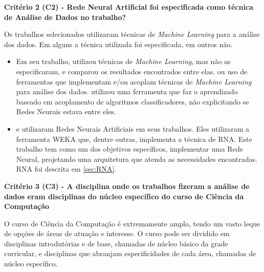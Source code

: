 \documentclass[
	12pt,				%
	openright,			%
	oneside,
	a4paper,			%
	english,			%
	french,				%
	spanish,			%
	brazil,				%
	]{abntex2}
\begin{document}
\textbf{Critério 2 (C2) - Rede Neural Artificial foi especificada como técnica de Análise de Dados no trabalho?}

Os trabalhos selecionados utilizaram técnicas de \textit{Machine Learning} para a análise dos dados. Em alguns a técnica utilizada foi especificada, em outros não.

\begin{itemize}
    \item Em seu trabalho,  utilizou técnicas de \textit{Machine Learning}, mas não as especificaram, e comparou os resultados encontrados entre elas. ou uso de ferramentas que implementam e/ou acoplam técnicas de \textit{Machine Learning} para análise dos dados.  utilizou uma ferramenta que faz o aprendizado baseado em acoplamento de algoritmos classificadores, não explicitando se Redes Neurais estava entre eles.
    \item {} e  utilizaram Redes Neurais Artificiais em seus trabalhos. Eles utilizaram a ferramenta WEKA que, dentre outras, implementa a técnica de RNA. Este trabalho tem como um dos objetivos específicos, implementar uma Rede Neural, projetando uma arquitetura que atenda as necessidades encontradas. RNA foi descrita em \autoref{sec:RNA}.
\end{itemize}

\textbf{Critério 3 (C3) - A disciplina onde os trabalhos fizeram a análise de dados eram disciplinas do núcleo específico do curso de Ciência da Computação}

O curso de Ciência da Computação é extremamente amplo, tendo um vasto leque de opções de áreas de atuação e interesse. O curso pode ser dividido em disciplinas introdutórias e de base, chamadas de núcleo básico da grade curricular, e disciplinas que abranjam especificidades de cada área, chamadas de núcleo específico.
\end{document}
